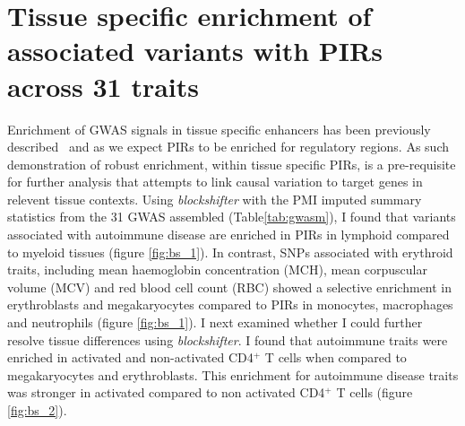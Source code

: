 \documentclass[a4paper,11pt]{report}
\begin{document}

\section{Tissue specific enrichment of associated variants with PIRs across 31 traits}
Enrichment of GWAS signals in tissue specific enhancers has been previously described~\citep{MauranoHumbertRynesEtAl2012} and as we expect PIRs to be enriched for regulatory regions. As such demonstration of robust enrichment, within tissue specific PIRs, is a pre-requisite for further analysis that attempts to link causal variation to target genes in relevent tissue contexts.  Using \textit{blockshifter} with the PMI imputed summary statistics from the 31 GWAS assembled (Table\ref{tab:gwasm}), I found that variants associated with autoimmune disease are enriched in PIRs in lymphoid compared to myeloid tissues (figure \ref{fig:bs_1}). In contrast, SNPs associated with erythroid traits, including mean haemoglobin concentration (MCH), mean corpuscular volume (MCV) and red blood cell count (RBC) showed a selective enrichment in erythroblasts and megakaryocytes compared to PIRs in monocytes, macrophages and neutrophils (figure \ref{fig:bs_1}). I next examined whether I could further resolve tissue differences using \textit{blockshifter}. I found that autoimmune traits were enriched in activated and non-activated CD4$^{+}$ T cells when compared to megakaryocytes and erythroblasts. This enrichment for autoimmune disease traits was stronger in activated  compared to non activated CD4$^{+}$ T cells (figure \ref{fig:bs_2}).
\end{document}

